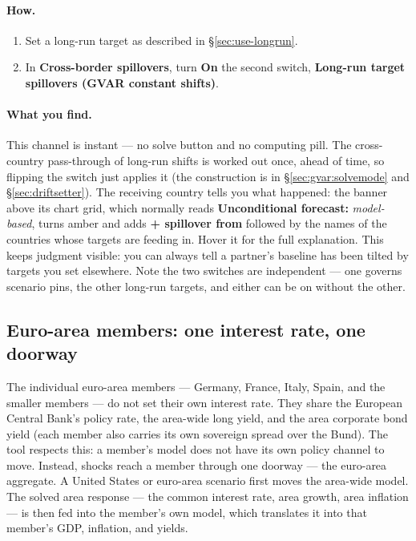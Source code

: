 \documentclass[11pt]{article}
\theoremstyle{definition}
\theoremstyle{remark}
\begin{document}
\paragraph{How.}
\begin{enumerate}
  \item Set a long-run target as described in \S\ref{sec:use-longrun}.
  \item In \textbf{Cross-border spillovers}, turn \textbf{On} the second switch,
    \textbf{Long-run target spillovers (GVAR constant shifts)}.
\end{enumerate}

\paragraph{What you find.} This channel is instant --- no solve button and no
computing pill. The cross-country pass-through of long-run shifts is worked out
once, ahead of time, so flipping the switch just applies it (the construction is
in \S\ref{sec:gvar:solvemode} and \S\ref{sec:driftsetter}). The receiving
country tells you what happened: the banner above its chart grid, which normally
reads \textbf{Unconditional forecast:} \emph{model-based}, turns amber and adds
\textbf{+ spillover from} followed by the names of the countries whose targets
are feeding in. Hover it for the full explanation. This keeps judgment visible:
you can always tell a partner's baseline has been tilted by targets you set
elsewhere. Note the two switches are independent --- one governs scenario pins,
the other long-run targets, and either can be on without the other.

\subsection{Euro-area members: one interest rate, one doorway}

The individual euro-area members --- Germany, France, Italy, Spain, and the
smaller members --- do not set their own interest rate. They share the European
Central Bank's policy rate, the area-wide long yield, and the area corporate
bond yield (each member also carries its own sovereign spread over the Bund).
The tool respects this: a member's model does not have its own policy channel to
move. Instead, shocks reach a member through one doorway --- the euro-area
aggregate. A United States or euro-area scenario first moves the area-wide
model. The solved area response --- the common interest rate, area growth, area
inflation --- is then fed into the member's own model, which translates it into
that member's GDP, inflation, and yields.
\end{document}
